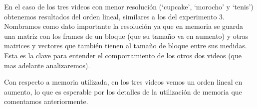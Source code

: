 \begin{figure}[ht]
	\begin{center}
	\end{center}
\end{figure}
\FloatBarrier
\par En el caso de los tres videos con menor resoluci\'on (`cupcake', `morocho' y `tenis') obtenemos resultados del orden lineal, similares a los del experimento 3. Nombramos como dato importante la resoluci\'on ya que en memoria se guarda una matriz con los frames de un bloque (que su tama\~no va en aumento) y otras matrices y vectores que tambi\'en tienen al tama\~no de bloque entre sus medidas. Esta es la clave para entender el comportamiento de los otros dos videos (que mas adelante analizaremos).

\begin{figure}[ht]
	\begin{center}
	\end{center}
\end{figure}
\FloatBarrier
\par Con respecto a memoria utilizada, en los tres videos vemos un orden lineal en aumento, lo que es esperable por los detalles de la utilizaci\'on de memoria que comentamos anteriormente.

